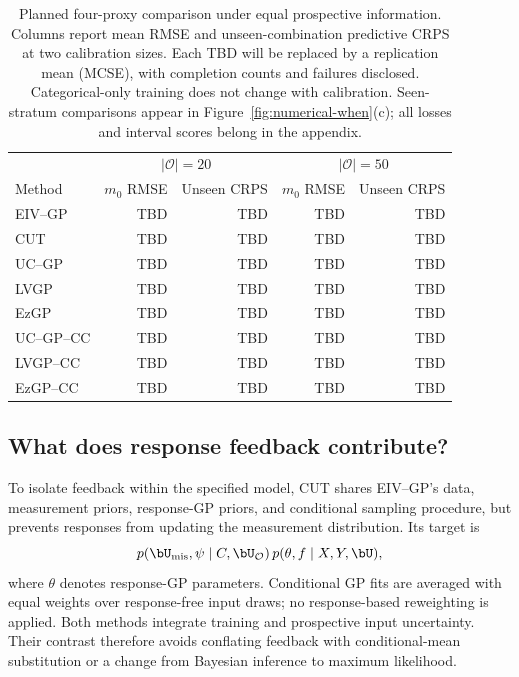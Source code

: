 \begin{table}[!htbp]
\centering\small
\caption{Planned four-proxy comparison under equal prospective information. Columns report mean RMSE and unseen-combination predictive CRPS at two calibration sizes. Each TBD will be replaced by a replication mean (MCSE), with completion counts and failures disclosed. Categorical-only training does not change with calibration. Seen-stratum comparisons appear in Figure~\ref{fig:numerical-when}(c); all losses and interval scores belong in the appendix.}
\label{tab:numerical-calibration-fairness}
\begin{tabular}{lrrrr}
\toprule
 & \multicolumn{2}{c}{$|\mathcal O|=20$} & \multicolumn{2}{c}{$|\mathcal O|=50$}\\
Method & $m_0$ RMSE & Unseen CRPS & $m_0$ RMSE & Unseen CRPS\\
\midrule
EIV--GP & TBD & TBD & TBD & TBD\\
CUT & TBD & TBD & TBD & TBD\\
UC--GP & TBD & TBD & TBD & TBD\\
LVGP & TBD & TBD & TBD & TBD\\
EzGP & TBD & TBD & TBD & TBD\\
UC--GP--CC & TBD & TBD & TBD & TBD\\
LVGP--CC & TBD & TBD & TBD & TBD\\
EzGP--CC & TBD & TBD & TBD & TBD\\
\bottomrule
\end{tabular}
\end{table}

\subsection{What does response feedback contribute?}
To isolate feedback within the specified model, CUT shares EIV--GP's data, measurement priors, response-GP priors, and conditional sampling procedure, but prevents responses from updating the measurement distribution. Its target is
\[
 p(\bU_{\rm mis},\psi\mid C,\bU_{\mathcal O})\,
 p(\theta,f\mid X,Y,\bU),
\]
where $\theta$ denotes response-GP parameters. Conditional GP fits are averaged with equal weights over response-free input draws; no response-based reweighting is applied. Both methods integrate training and prospective input uncertainty. Their contrast therefore avoids conflating feedback with conditional-mean substitution or a change from Bayesian inference to maximum likelihood.

